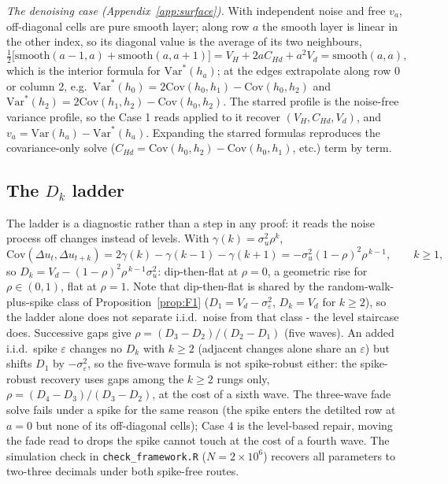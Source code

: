 \documentclass[11pt]{article}
\theoremstyle{remark}
\newcommand{\Var}{\mathrm{Var}}
\newcommand{\Cov}{\mathrm{Cov}}
\begin{document}
\emph{The denoising case (Appendix~\ref{app:surface}).} With independent noise and free $v_a$, off-diagonal cells are pure smooth layer; along row $a$ the smooth layer is linear in the other index, so its diagonal value is the average of its two neighbours,
\begin{equation}
\tfrac12\bigl[\text{smooth}(a-1,a)+\text{smooth}(a,a+1)\bigr]
=V_H+2aC_{Hd}+a^2V_d=\text{smooth}(a,a),
\end{equation}
which is the interior formula for $\Var^{*}(h_a)$; at the edges extrapolate along row 0 or column 2, e.g.\ $\Var^{*}(h_0)=2\Cov(h_0,h_1)-\Cov(h_0,h_2)$ and $\Var^{*}(h_2)=2\Cov(h_1,h_2)-\Cov(h_0,h_2)$.
The starred profile is the noise-free variance profile, so the Case 1 reads applied to it recover $(V_H,C_{Hd},V_d)$, and $v_a=\Var(h_a)-\Var^{*}(h_a)$.
Expanding the starred formulas reproduces the covariance-only solve ($C_{Hd}=\Cov(h_0,h_2)-\Cov(h_0,h_1)$, etc.) term by term.

\subsection*{The $D_k$ ladder}

The ladder is a diagnostic rather than a step in any proof: it reads the noise process off changes instead of levels. With $\gamma(k)=\sigma^2_u\rho^k$,
\begin{equation}
\Cov(\Delta u_t,\Delta u_{t+k})=2\gamma(k)-\gamma(k-1)-\gamma(k+1)
=-\sigma^2_u(1-\rho)^2\rho^{\,k-1}, \qquad k\ge1,
\end{equation}
so $D_k=V_d-(1-\rho)^2\rho^{\,k-1}\sigma^2_u$: dip-then-flat at $\rho=0$, a geometric rise for $\rho\in(0,1)$, flat at $\rho=1$.
Note that dip-then-flat is shared by the random-walk-plus-spike class of Proposition~\ref{prop:F1} ($D_1=V_d-\sigma^2_\varepsilon$, $D_k=V_d$ for $k\ge2$), so the ladder alone does not separate i.i.d.\ noise from that class - the level staircase does.
Successive gaps give $\rho=(D_3-D_2)/(D_2-D_1)$ (five waves).
An added i.i.d.\ spike $\varepsilon$ changes no $D_k$ with $k\ge2$ (adjacent changes alone share an $\varepsilon$) but shifts $D_1$ by $-\sigma^2_\varepsilon$, so the five-wave formula is not spike-robust either: the spike-robust recovery uses gaps among the $k\ge2$ rungs only, $\rho=(D_4-D_3)/(D_3-D_2)$, at the cost of a sixth wave.
The three-wave fade solve fails under a spike for the same reason (the spike enters the detilted row at $a=0$ but none of its off-diagonal cells); Case 4 is the level-based repair, moving the fade read to drops the spike cannot touch at the cost of a fourth wave.
The simulation check in \texttt{check\_framework.R} ($N=2\times10^6$) recovers all parameters to two-three decimals under both spike-free routes.
\end{document}
